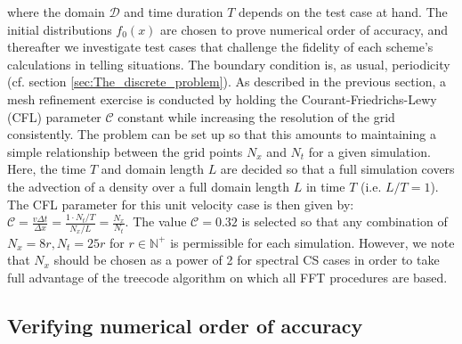 \documentclass[11pt,titlepage]{report}
\begin{document}
\noindent where the domain $\mathcal{D}$ and time duration $T$ depends on the test case at hand. The initial distributions $f_0(x)$ are chosen to prove numerical order of accuracy, and thereafter we investigate test cases that challenge the fidelity of each scheme's calculations in telling situations. The boundary condition is, as usual, periodicity (cf. section \ref{sec:The_discrete_problem}). As described in the previous section, a mesh refinement exercise is conducted by holding the Courant-Friedrichs-Lewy (CFL) parameter $\mathcal{C}$ constant while increasing the resolution of the grid consistently. The problem can be set up so that this amounts to maintaining a simple relationship between the grid points $N_x$ and $N_t$ for a given simulation. Here, the time $T$ and domain length $L$ are decided so that a full simulation covers the advection of a density over a full domain length $L$ in time $T$ (i.e. $L / T = 1$). The CFL parameter for this unit velocity case is then given by: $\mathcal{C} = \tfrac{v\Delta t}{\Delta x} = \tfrac{1\cdot N_t / T}{N_x / L} =  \tfrac{N_x}{N_t}$. The value $\mathcal{C} = 0.32$ is selected so that any combination of $N_x = 8r, N_t = 25r$ for $r\in\mathbb{N}^+$ is permissible for each simulation. However, we note that $N_x$ should be chosen as a power of 2 for spectral CS cases in order to take full advantage of the treecode algorithm on which all FFT procedures are based.


\subsection{Verifying numerical order of accuracy}
\end{document}
